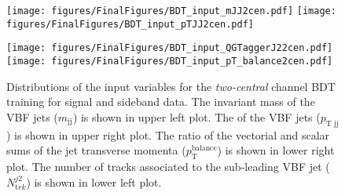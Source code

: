 \documentclass[PAPER, american,coverpage,texlive=2016, english]{\ATLASLATEXPATH atlasdoc}
\providecommand{\DIFaddbeginFL}{} %
\providecommand{\DIFaddendFL}{} %
\providecommand{\DIFdelbeginFL}{} %
\providecommand{\DIFdelendFL}{} %
\begin{document}
\begin{figure}[htbp]
  \centering

  \DIFdelbeginFL %
\DIFdelendFL \DIFaddbeginFL \texttt{[image: figures/FinalFigures/BDT\_input\_mJJ2cen.pdf]}
  \texttt{[image: figures/FinalFigures/BDT\_input\_pTJJ2cen.pdf]}

\DIFaddendFL 

  \DIFdelbeginFL %
\DIFdelendFL \DIFaddbeginFL \texttt{[image: figures/FinalFigures/BDT\_input\_QGTaggerJ22cen.pdf]}
  \texttt{[image: figures/FinalFigures/BDT\_input\_pT\_balance2cen.pdf]}
  \DIFaddendFL \caption{Distributions of the input variables for the \textit{two-central} channel BDT training for signal and sideband data. The invariant mass of the VBF jets ($m_{\text{jj}}$) is shown in upper left plot. The \pT{} of the VBF jets ($p_{\text{T~jj}}$) is shown in upper right plot.   The ratio of the vectorial and scalar sums of the jet transverse momenta ($p^{\text{balance}}_{\text{T}}$) is shown in lower right plot.  The number of tracks associated to the sub-leading VBF jet ($N_{\mathrm trk}^{j2}$) is shown in lower left plot.}
  \label{fig:bdtvar2cen2}
\end{figure}
\end{document}
